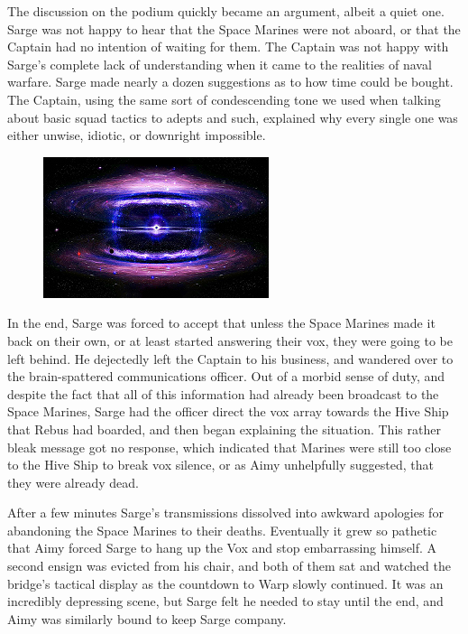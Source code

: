 The discussion on the podium quickly became an argument, albeit a quiet one. 
Sarge was not happy to hear that the Space Marines were not aboard, or that the Captain had no intention of waiting for them. 
The Captain was not happy with Sarge's complete lack of understanding when it came to the realities of naval warfare. 
Sarge made nearly a dozen suggestions as to how time could be bought. 
The Captain, using the same sort of condescending tone we used when talking about basic squad tactics to adepts and such, explained why every single one was either unwise, idiotic, or downright impossible.
\begin{figure}
	\begin{center}
		\includegraphics[width=\figwidth]{pics/12/72.png}
	\end{center}
\end{figure}
In the end, Sarge was forced to accept that unless the Space Marines made it back on their own, or at least started answering their vox, they were going to be left behind. 
He dejectedly left the Captain to his business, and wandered over to the brain-spattered communications officer. 
Out of a morbid sense of duty, and despite the fact that all of this information had already been broadcast to the Space Marines, Sarge had the officer direct the vox array towards the Hive Ship that Rebus had boarded, and then began explaining the situation. 
This rather bleak message got no response, which indicated that Marines were still too close to the Hive Ship to break vox silence, or as Aimy unhelpfully suggested, that they were already dead.

After a few minutes Sarge's transmissions dissolved into awkward apologies for abandoning the Space Marines to their deaths. 
Eventually it grew so pathetic that Aimy forced Sarge to hang up the Vox and stop embarrassing himself. 
A second ensign was evicted from his chair, and both of them sat and watched the bridge's tactical display as the countdown to Warp slowly continued. 
It was an incredibly depressing scene, but Sarge felt he needed to stay until the end, and Aimy was similarly bound to keep Sarge company. 


